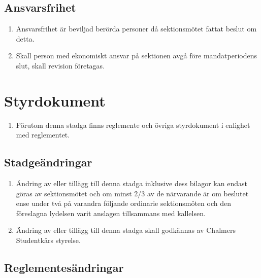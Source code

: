 \documentclass[11pt,a4paper]{article}
\begin{document}
\subsection{Ansvarsfrihet}
\begin{enumerate}[\thesubsection .1]

  \item Ansvarsfrihet är beviljad berörda personer då sektionsmötet
  fattat beslut om detta.

  \item Skall person med ekonomiskt ansvar på sektionen avgå
  före mandatperiodens slut, skall revision företagas.

\end{enumerate}

\newpage



\section{Styrdokument}
\begin{enumerate}[\thesubsection .1]

  \item Förutom denna stadga finns reglemente och övriga styrdokument i enlighet med reglementet. 
  
\end{enumerate}

\subsection{Stadgeändringar}

\begin{enumerate}[\thesubsection .1]

  \item Ändring av eller tillägg till denna stadga inklusive dess
  bilagor kan endast göras av sektionsmötet och om minst 2/3 av de
  närvarande är om beslutet ense under två på varandra följande
  ordinarie sektionsmöten och den föreslagna lydelsen varit anslagen
  tillsammans med kallelsen.

  \item Ändring av eller tillägg till denna stadga skall godkännas av
   Chalmers Studentkårs styrelse.

\end{enumerate}

\subsection{Reglementesändringar}
\end{document}
